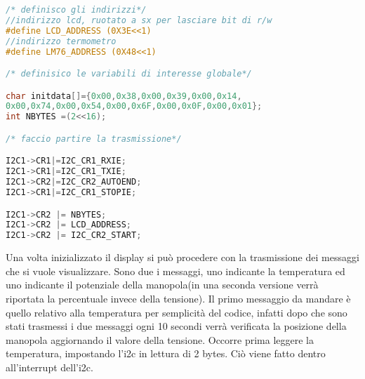 \documentclass[main.tex]{subfiles}
\begin{document}
\begin{lstlisting}[language=C,caption=Inizio inizializzazione]
/* definisco gli indirizzi*/
//indirizzo lcd, ruotato a sx per lasciare bit di r/w
#define LCD_ADDRESS (0X3E<<1) 
//indirizzo termometro
#define LM76_ADDRESS (0X48<<1) 

/* definisico le variabili di interesse globale*/

char initdata[]={0x00,0x38,0x00,0x39,0x00,0x14,
0x00,0x74,0x00,0x54,0x00,0x6F,0x00,0x0F,0x00,0x01};
int NBYTES =(2<<16);

/* faccio partire la trasmissione*/

I2C1->CR1|=I2C_CR1_RXIE;
I2C1->CR1|=I2C_CR1_TXIE;
I2C1->CR2|=I2C_CR2_AUTOEND;
I2C1->CR1|=I2C_CR1_STOPIE;

I2C1->CR2 |= NBYTES;
I2C1->CR2 |= LCD_ADDRESS;
I2C1->CR2 |= I2C_CR2_START;
\end{lstlisting}

Una volta inizializzato il display si può procedere con la trasmissione dei messaggi che si vuole visualizzare. Sono due i messaggi, uno indicante la temperatura ed uno indicante il potenziale della manopola(in una seconda versione verrà riportata la percentuale invece della tensione). Il primo messaggio da mandare è quello relativo alla temperatura per semplicità del codice, infatti dopo che sono stati trasmessi i due messaggi ogni 10 secondi verrà verificata la posizione della manopola aggiornando il valore della tensione. Occorre prima leggere la temperatura, impostando l'i2c in lettura di 2 bytes. Ciò viene fatto dentro all'interrupt dell'i2c.
\end{document}

